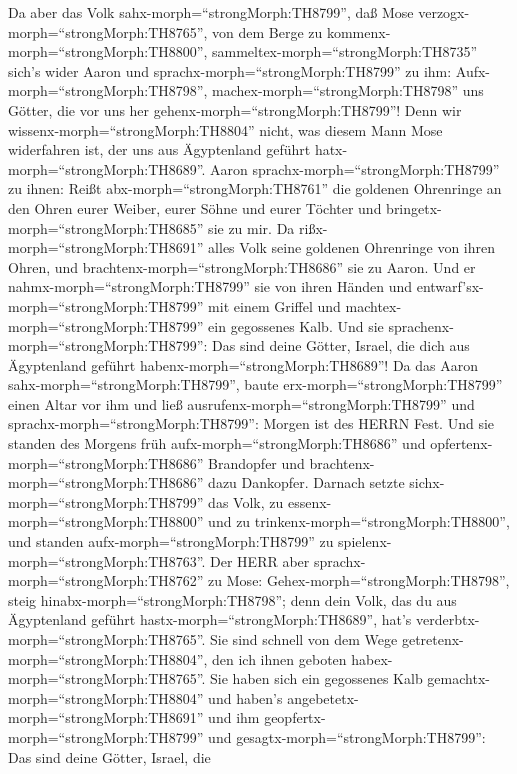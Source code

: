  Da aber das Volk sahx-morph=``strongMorph:TH8799'', daß
Mose verzogx-morph=``strongMorph:TH8765'', von dem Berge zu
kommenx-morph=``strongMorph:TH8800'',
sammeltex-morph=``strongMorph:TH8735'' sich's wider Aaron und
sprachx-morph=``strongMorph:TH8799'' zu ihm:
Aufx-morph=``strongMorph:TH8798'', machex-morph=``strongMorph:TH8798''
uns Götter, die vor uns her gehenx-morph=``strongMorph:TH8799''! Denn
wir wissenx-morph=``strongMorph:TH8804'' nicht, was diesem Mann Mose
widerfahren ist, der uns aus Ägyptenland geführt
hatx-morph=``strongMorph:TH8689''.  Aaron
sprachx-morph=``strongMorph:TH8799'' zu ihnen: Reißt
abx-morph=``strongMorph:TH8761'' die goldenen Ohrenringe an den Ohren
eurer Weiber, eurer Söhne und eurer Töchter und
bringetx-morph=``strongMorph:TH8685'' sie zu mir.  Da
rißx-morph=``strongMorph:TH8691'' alles Volk seine goldenen Ohrenringe
von ihren Ohren, und brachtenx-morph=``strongMorph:TH8686'' sie zu
Aaron.  Und er nahmx-morph=``strongMorph:TH8799'' sie von
ihren Händen und entwarf'sx-morph=``strongMorph:TH8799'' mit einem
Griffel und machtex-morph=``strongMorph:TH8799'' ein gegossenes Kalb.
Und sie sprachenx-morph=``strongMorph:TH8799'': Das sind deine Götter,
Israel, die dich aus Ägyptenland geführt
habenx-morph=``strongMorph:TH8689''!  Da das Aaron
sahx-morph=``strongMorph:TH8799'', baute
erx-morph=``strongMorph:TH8799'' einen Altar vor ihm und ließ
ausrufenx-morph=``strongMorph:TH8799'' und
sprachx-morph=``strongMorph:TH8799'': Morgen ist des HERRN Fest.
 Und sie standen des Morgens früh
aufx-morph=``strongMorph:TH8686'' und
opfertenx-morph=``strongMorph:TH8686'' Brandopfer und
brachtenx-morph=``strongMorph:TH8686'' dazu Dankopfer. Darnach setzte
sichx-morph=``strongMorph:TH8799'' das Volk, zu
essenx-morph=``strongMorph:TH8800'' und zu
trinkenx-morph=``strongMorph:TH8800'', und standen
aufx-morph=``strongMorph:TH8799'' zu
spielenx-morph=``strongMorph:TH8763''.  Der HERR aber
sprachx-morph=``strongMorph:TH8762'' zu Mose:
Gehex-morph=``strongMorph:TH8798'', steig
hinabx-morph=``strongMorph:TH8798''; denn dein Volk, das du aus
Ägyptenland geführt hastx-morph=``strongMorph:TH8689'', hat's
verderbtx-morph=``strongMorph:TH8765''.  Sie sind schnell
von dem Wege getretenx-morph=``strongMorph:TH8804'', den ich ihnen
geboten habex-morph=``strongMorph:TH8765''. Sie haben sich ein
gegossenes Kalb gemachtx-morph=``strongMorph:TH8804'' und haben's
angebetetx-morph=``strongMorph:TH8691'' und ihm
geopfertx-morph=``strongMorph:TH8799'' und
gesagtx-morph=``strongMorph:TH8799'': Das sind deine Götter, Israel, die
